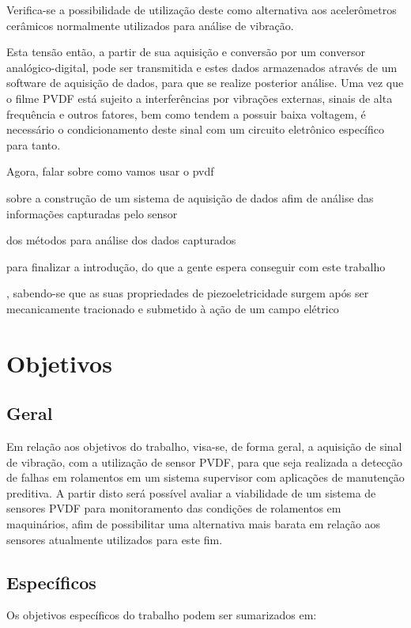 \documentclass[
	12pt,				
	oneside,			
	a4paper,			
	english,			
	brazil				
	]{abntex2ppgsi}
\begin{document}
Verifica-se a possibilidade de utilização deste como alternativa aos acelerômetros cerâmicos normalmente utilizados para análise de vibração.    

Esta tensão então, a partir de sua aquisição e conversão por um conversor analógico-digital, pode ser transmitida e estes dados armazenados através de um software de aquisição de dados, para que se realize posterior análise. Uma vez que o filme PVDF está sujeito a interferências por vibrações externas, sinais de alta frequência e outros fatores, bem como tendem a possuir baixa voltagem, é necessário o condicionamento deste sinal com um circuito eletrônico específico para tanto. 

Agora, falar sobre como vamos usar o pvdf 

sobre a construção de um sistema de aquisição de dados afim de análise das informações capturadas pelo sensor

dos métodos para análise dos dados capturados

para finalizar a introdução, do que a gente espera conseguir com este trabalho

, sabendo-se que as suas propriedades de piezoeletricidade surgem após ser mecanicamente tracionado e submetido à ação de um campo elétrico 


\chapter{Objetivos}

\section{\textbf {Geral}}

Em relação aos objetivos do trabalho, visa-se, de forma geral, a aquisição de sinal de vibração, com a utilização de sensor PVDF, para que seja realizada a detecção de falhas em rolamentos em um sistema supervisor com aplicações de manutenção preditiva. A partir disto será possível avaliar a viabilidade de um sistema de sensores PVDF para monitoramento das condições de rolamentos em maquinários, afim de possibilitar uma alternativa mais barata em relação aos sensores atualmente utilizados para este fim.

\section{\textbf {Específicos}}

Os objetivos específicos do trabalho podem ser sumarizados em:
\end{document}

